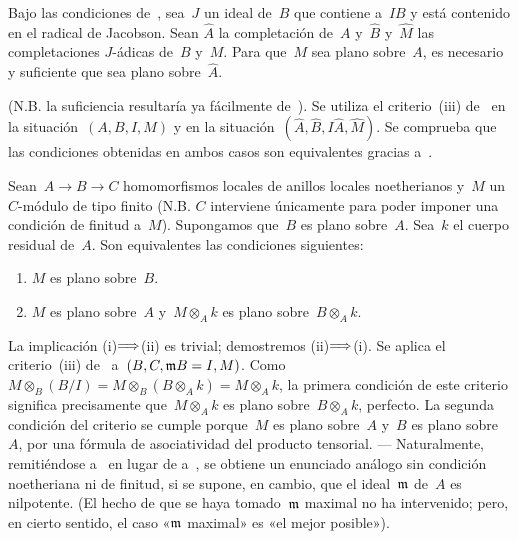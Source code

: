 \begin{corollaire}
\label{IV.5.8}
Bajo las condiciones de~, sea~$J$ un ideal de~$B$ que
contiene a~$IB$ y está contenido en el radical de Jacobson. Sean
$\hat A$ la completación
 de~$A$ y~$\hat B$
y~$\hat M$ las completaciones $J$-ádicas de~$B$ y~$M$. Para que~$M$ sea
plano sobre~$A$, es necesario y suficiente que
 sea plano sobre~$\hat A$.
\end{corollaire}

(N.B. la suficiencia resultaría ya fácilmente de~). Se
utiliza el criterio~(iii) de~ en la situación~$(A,B,I,M)$ y
en la situación~$(\hat A,\hat B,I\hat A,\hat M)$. Se comprueba que las
condiciones obtenidas en ambos casos son equivalentes gracias
a~.

\begin{corollaire}
\label{IV.5.9}
Sean~$A\to B\to C$ homomorfismos locales de anillos locales
noetherianos y~$M$ un $C$-módulo de tipo finito (N.B. $C$ interviene
únicamente para poder imponer una condición de finitud a~$M$).
Supongamos que~$B$ es plano sobre~$A$. Sea~$k$ el cuerpo residual de~$A$.
Son equivalentes las condiciones siguientes:
\begin{enumerate}
\item[(i)] $M$ es plano sobre~$B$.
\item[(ii)] $M$ es plano sobre~$A$ y~$M\otimes_A k$ es plano
sobre~$B\otimes_A k$.
\end{enumerate}
\end{corollaire}

La implicación (i)$\Longrightarrow$(ii) es trivial; demostremos (ii)$\Longrightarrow$(i). Se
aplica el criterio~(iii) de~ a~$(B,C,\mathfrak{m}B=I,M)$. Como
$M\otimes_B(B/I)=M\otimes_B(B\otimes_A k)=M\otimes_A k$, la primera
condición de este criterio significa precisamente que~$M\otimes_A k$ es
plano sobre~$B\otimes_A k$, perfecto.
La segunda condición del criterio se cumple porque~$M$ es plano sobre~$A$
y~$B$ es plano sobre~$A$, por una fórmula de asociatividad del producto
tensorial. --- Naturalmente, remitiéndose a~ en lugar de
a~, se obtiene un enunciado análogo sin condición noetheriana
ni de finitud, si se supone, en cambio, que el ideal~$\mathfrak{m}$ de~$A$ es
nilpotente. (El hecho de que se haya tomado~$\mathfrak{m}$ maximal no ha
intervenido; pero, en cierto sentido, el caso «$\mathfrak{m}$ maximal» es «el
mejor posible»).
